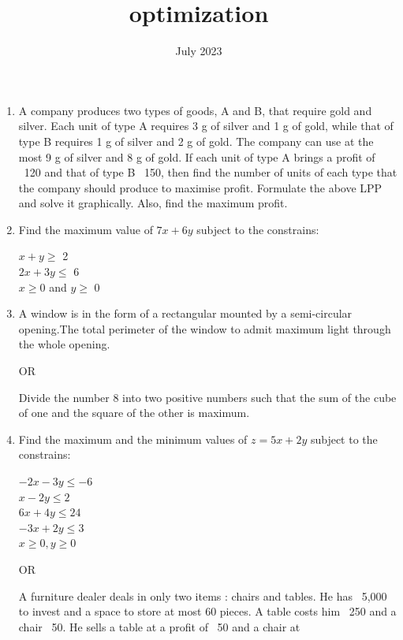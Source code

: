 \documentclass{article}
\begin{document}
\begin{center}
\title{optimization}
\date{July 2023}
\maketitle     
\end{center}
\begin{enumerate}
  
\item A company produces two types of goods, A and B, that require gold and
silver. Each unit of type A requires 3 g of silver and 1 g of gold, while that
of type B requires 1 g of silver and 2 g of gold. The company can use at
the most 9 g of silver and 8 g of gold. If each unit of type A brings a profit
of \rupee~120 and that of type B \rupee~150, then find the number of units of each
type that the company should produce to maximise profit.
Formulate the above LPP and solve it graphically. Also, find the
maximum profit.
\item Find the maximum value of $7x+6y$ subject to the constrains:
\begin{center}
    $x+y \geq $  2\\
    $2x+3y\leq$ 6\\
    $x \geq 0$ and $y\geq$ 0
\end{center}
\item A window is in the form of a rectangular mounted by a semi-circular opening.The total perimeter of the window to admit maximum light through the whole opening.
\begin{center}
    OR
\end{center}
Divide the number 8 into two positive numbers such that the sum of the cube of one and the square of the other is maximum.
\item Find the maximum and the minimum values of $z=5x+2y$ subject to the constrains:
\begin{center}
$-2x-3y\leq-6$\\
$x-2y\leq2$\\
$6x+4y\leq24$\\
$-3x+2y\leq3$\\
$x\geq0,y\geq0$
\end{center}
 \begin{center}
     OR
 \end{center}  
 A furniture dealer deals in only two items : chairs and tables. He has
\rupee~5,000  to invest and a space to store at most 60 pieces. A table costs him
\rupee~250 and a chair \rupee~50. He sells a table at a profit of \rupee~50 and a chair at

\end{enumerate}
\end{document}
